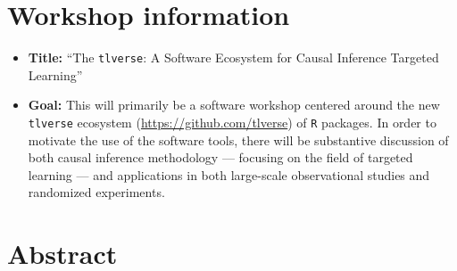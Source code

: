 \documentclass[a4paper,11pt]{texMemo}
\newcommand{\note}[2][]{\added[#1,remark={#2}]{}}
\begin{document}
\maketitle
\vspace{-0.25in}
\section{Workshop information}\note[id=RP]{Remove this section header and simply including the title, saves space}

\begin{itemize}
  \itemsep1pt
  \item \textbf{Title:} ``The \texttt{tlverse}: A Software Ecosystem for Causal Inference 
    Targeted Learning'' \note[id=RP]{or, ...Ecosystem of Targeted Learning for Causal Inference.}
  \item \textbf{Goal:} This will primarily be a software workshop centered around the new \texttt{tlverse} ecosystem (\url{https://github.com/tlverse}) of \texttt{R} packages. In order to motivate the use of the software tools, there will be substantive discussion\note[id=RP]{I think "discussion" is weak here. This "Goal" paragraph is the most important part of the document since it comes first. It doesn't appear to be required \textbf{I think it should be omitted}. Omission will force the reviewer to actually read the abstract instead of reading this summarized version of it} of both causal inference methodology --- focusing on the field of targeted learning --- and applications in both large-scale observational studies and randomized experiments.
\end{itemize}

\section{Abstract}
\end{document}
